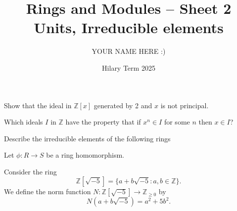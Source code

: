 \documentclass[answers]{exam}
\title{Rings and Modules -- Sheet 2\\Units, Irreducible elements}
\author{YOUR NAME HERE :)}
\date{Hilary Term 2025}
\begin{document}
\maketitle

\begin{questions}

\question%
Show that the ideal in $\mathbb{Z}[x]$ generated by 2 and $x$ is not principal.



\question%
Which ideals $I$ in $\mathbb{Z}$ have the property that if $x^{n} \in I$ for some $n$ then $x \in I$?



\question%
Describe the irreducible elements of the following rings



\question%
Let $\phi: R \to S$ be a ring homomorphism.



\question%
Consider the ring \[
	\mathbb{Z}[\sqrt{-5}]=\{a+b \sqrt{-5}: a, b \in \mathbb{Z}\}.
\] We define the norm function $N: \mathbb{Z}[\sqrt{-5}] \to \mathbb{Z}_{\geq 0}$ by \[
	N(a+b \sqrt{-5})=a^{2}+5 b^{2} .
\]
\begin{parts}

\end{parts}
\end{questions}
\end{document}
